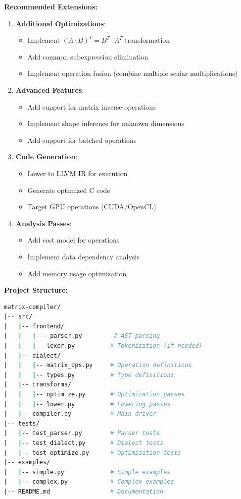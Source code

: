 \documentclass[11pt,a4paper]{article}
\begin{document}
\textbf{Recommended Extensions:}
\begin{enumerate}
    \item \textbf{Additional Optimizations}:
    \begin{itemize}
        \item Implement $(A \cdot B)^T = B^T \cdot A^T$ transformation
        \item Add common subexpression elimination
        \item Implement operation fusion (combine multiple scalar multiplications)
    \end{itemize}
    
    \item \textbf{Advanced Features}:
    \begin{itemize}
        \item Add support for matrix inverse operations
        \item Implement shape inference for unknown dimensions
        \item Add support for batched operations
    \end{itemize}
    
    \item \textbf{Code Generation}:
    \begin{itemize}
        \item Lower to LLVM IR for execution
        \item Generate optimized C code
        \item Target GPU operations (CUDA/OpenCL)
    \end{itemize}
    
    \item \textbf{Analysis Passes}:
    \begin{itemize}
        \item Add cost model for operations
        \item Implement data dependency analysis
        \item Add memory usage optimization
    \end{itemize}
\end{enumerate}

\textbf{Project Structure:}
\begin{lstlisting}[language=bash, caption=Recommended project organization]
matrix-compiler/
|-- src/
|   |-- frontend/
|   |   |--- parser.py         # AST parsing
|   |   |-- lexer.py          # Tokenization (if needed)
|   |-- dialect/
|   |   |-- matrix_ops.py     # Operation definitions
|   |   |-- types.py          # Type definitions
|   |-- transforms/
|   |   |-- optimize.py       # Optimization passes
|   |   |-- lower.py          # Lowering passes
|   |-- compiler.py           # Main driver
|-- tests/
|   |-- test_parser.py        # Parser tests
|   |-- test_dialect.py       # Dialect tests
|   |-- test_optimize.py      # Optimization tests
|-- examples/
|   |-- simple.py             # Simple examples
|   |-- complex.py            # Complex examples
|-- README.md                 # Documentation
\end{lstlisting}
\end{document}
